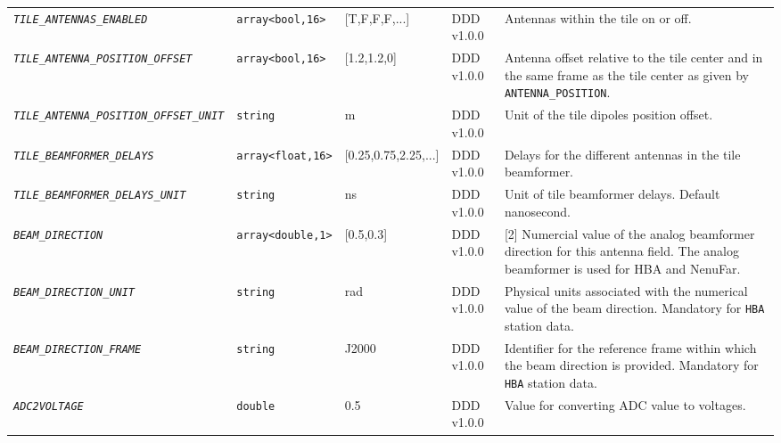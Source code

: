 \documentclass[a4paper,10pt,bibtotoc]{scrartcl}
\begin{document}
\begin{landscape}
\begin{center}
\begin{supertabular}{|llllp{5.25cm}|}
    \small \textit{\texttt{TILE\_ANTENNAS\_ENABLED}} & \texttt{array<bool,16>} & [T,F,F,F,...] & DDD v1.0.0& Antennas within the tile on or off.  \\
    \small \textit{\texttt{TILE\_ANTENNA\_POSITION\_OFFSET}} & \texttt{array<bool,16>} & [1.2,1.2,0] & DDD v1.0.0& Antenna offset relative  to the tile center and in the same frame as the tile center as given by \texttt{ANTENNA\_POSITION}.  \\
    \small \textit{\texttt{TILE\_ANTENNA\_POSITION\_OFFSET\_UNIT}} & \texttt{string} & m & DDD v1.0.0& Unit of the tile dipoles position offset.  \\
    \small \textit{\texttt{TILE\_BEAMFORMER\_DELAYS}} & \texttt{array<float,16>} & [0.25,0.75,2.25,...] & DDD v1.0.0& Delays for the different antennas in the tile beamformer.   \\
    \small \textit{\texttt{TILE\_BEAMFORMER\_DELAYS\_UNIT}} & \texttt{string} & ns & DDD v1.0.0 & Unit of tile beamformer delays. Default nanosecond.  \\

    \small {\textit{\texttt{BEAM\_DIRECTION}}} & \verb|array<double,1>| & [0.5,0.3] & DDD v1.0.0 & [2] Numercial value of the analog beamformer direction for this antenna field. The analog beamformer is used for HBA and NenuFar.\\
    \small {\textit{\texttt{BEAM\_DIRECTION\_UNIT}}}  & \verb|string| & rad & DDD v1.0.0 & Physical units associated with the numerical value of the beam direction. Mandatory for \verb|HBA| station data.\\
    \small {\textit{\texttt{BEAM\_DIRECTION\_FRAME}}} & \verb|string| & J2000 & DDD v1.0.0 & Identifier for the reference frame within which the beam direction is provided. Mandatory for \verb|HBA| station data.\\
        \small \textit{\texttt{ADC2VOLTAGE}} & \verb|double| & 0.5 & DDD v1.0.0 & Value for converting ADC value to voltages. \\
    
    \hline
  \end{supertabular}
  \label{tab:antenna table}
\end{center}
\end{landscape}
\end{document}

